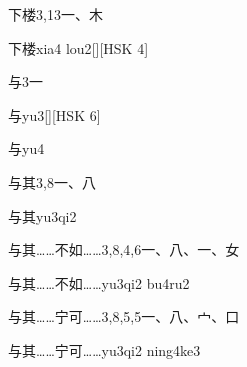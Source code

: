 \begin{Entry}{下楼}{3,13}{⼀、⽊}
  \begin{Phonetics}{下楼}{xia4 lou2}[][HSK 4]
  \end{Phonetics}
\end{Entry}

\begin{Entry}{与}{3}{⼀}
  \begin{Phonetics}{与}{yu3}[][HSK 6]
  \end{Phonetics}
  \begin{Phonetics}{与}{yu4}
  \end{Phonetics}
\end{Entry}

\begin{Entry}{与其}{3,8}{⼀、⼋}
  \begin{Phonetics}{与其}{yu3qi2}
  \end{Phonetics}
\end{Entry}

\begin{Entry}{与其……不如……}{3,8,4,6}{⼀、⼋、⼀、⼥}
  \begin{Phonetics}{与其……不如……}{yu3qi2 bu4ru2}
  \end{Phonetics}
\end{Entry}

\begin{Entry}{与其……宁可……}{3,8,5,5}{⼀、⼋、⼧、⼝}
  \begin{Phonetics}{与其……宁可……}{yu3qi2 ning4ke3}
  \end{Phonetics}
\end{Entry}

